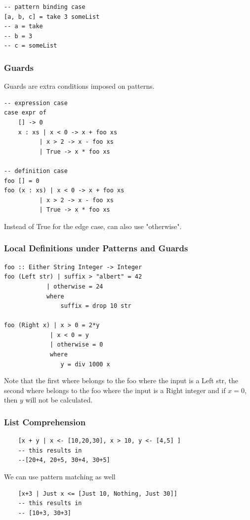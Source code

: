 \documentclass[12pt]{article}
\begin{document}
\begin{lstlisting}
-- pattern binding case
[a, b, c] = take 3 someList
-- a = take
-- b = 3
-- c = someList
\end{lstlisting}

\subsubsection{Guards}

Guards are extra conditions imposed on patterns.

\begin{lstlisting}
-- expression case
case expr of
	[] -> 0
	x : xs | x < 0 -> x + foo xs
		  | x > 2 -> x - foo xs
		  | True -> x * foo xs
		  
-- definition case
foo [] = 0
foo (x : xs) | x < 0 -> x + foo xs
		  | x > 2 -> x - foo xs
		  | True -> x * foo xs
\end{lstlisting}

Instead of True for the edge case, can also use "otherwise".

\subsubsection{Local Definitions under Patterns and Guards}

\begin{lstlisting}
foo :: Either String Integer -> Integer
foo (Left str) | suffix > "albert" = 42
		    | otherwise = 24
		    where
		    	suffix = drop 10 str

foo (Right x) | x > 0 = 2*y
		     | x < 0 = y
		     | otherwise = 0
		     where
		     	y = div 1000 x
\end{lstlisting}
Note that the first where belongs to the foo where the input is a Left str, the second where belongs to the foo where the input is a Right integer and if $x=0$, then $y$ will not be calculated.

\subsubsection{List Comprehension}

\begin{lstlisting}
	[x + y | x <- [10,20,30], x > 10, y <- [4,5] ]
	-- this results in
	--[20+4, 20+5, 30+4, 30+5]
\end{lstlisting}

We can use pattern matching as well

\begin{lstlisting}
	[x+3 | Just x <= [Just 10, Nothing, Just 30]]
	-- this results in
	-- [10+3, 30+3]
\end{lstlisting}
\end{document}
